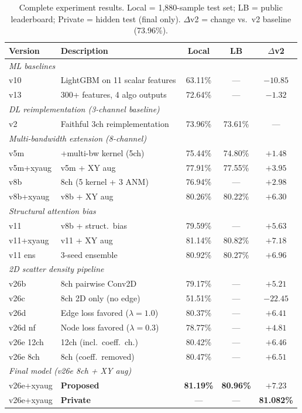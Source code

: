 \begin{table}[ht]
	\centering
	\caption{Complete experiment results. Local = 1,880-sample test set; LB = public leaderboard; Private = hidden test (final only). $\Delta$v2 = change vs.\ v2 baseline (73.96\%).}
	\label{tab:all_results}
	\small
	\begin{tabularx}{\textwidth}{lXccc}
		\toprule
		\textbf{Version} & \textbf{Description} & \textbf{Local} & \textbf{LB} & \textbf{$\Delta$v2} \\
		\midrule
		\multicolumn{5}{l}{\textit{ML baselines}} \\
		v10 & LightGBM on 11 scalar features & 63.11\% & --- & $-10.85$ \\
		v13 & 300+ features, 4 algo outputs & 72.64\% & --- & $-1.32$ \\
		\midrule
		\multicolumn{5}{l}{\textit{DL reimplementation (3-channel baseline)}} \\
		v2 & Faithful 3ch reimplementation & 73.96\% & 73.61\% & --- \\
		\midrule
		\multicolumn{5}{l}{\textit{Multi-bandwidth extension (8-channel)}} \\
		v5m & +multi-bw kernel (5ch) & 75.44\% & 74.80\% & $+1.48$ \\
		v5m+xyaug & v5m + XY aug & 77.91\% & 77.55\% & $+3.95$ \\
		v8b & 8ch (5 kernel + 3 ANM) & 76.94\% & --- & $+2.98$ \\
		v8b+xyaug & v8b + XY aug & 80.26\% & 80.22\% & $+6.30$ \\
		\midrule
		\multicolumn{5}{l}{\textit{Structural attention bias}} \\
		v11 & v8b + struct.\ bias & 79.59\% & --- & $+5.63$ \\
		v11+xyaug & v11 + XY aug & 81.14\% & 80.82\% & $+7.18$ \\
		v11 ens & 3-seed ensemble & 80.92\% & 80.27\% & $+6.96$ \\
		\midrule
		\multicolumn{5}{l}{\textit{2D scatter density pipeline}} \\
		v26b & 8ch pairwise Conv2D & 79.17\% & --- & $+5.21$ \\
		v26c & 8ch 2D only (no edge) & 51.51\% & --- & $-22.45$ \\
		v26d & Edge loss favored ($\lambda=1.0$) & 80.37\% & --- & $+6.41$ \\
		v26d nf & Node loss favored ($\lambda=0.3$) & 78.77\% & --- & $+4.81$ \\
		v26e 12ch & 12ch (incl.\ coeff.\ ch.) & 80.42\% & --- & $+6.46$ \\
		v26e 8ch & 8ch (coeff.\ removed) & 80.47\% & --- & $+6.51$ \\
		\midrule
		\multicolumn{5}{l}{\textit{Final model (v26e 8ch + XY aug)}} \\
		v26e+xyaug & \textbf{Proposed} & \textbf{81.19\%} & \textbf{80.96\%} & $\mathbf{+7.23}$ \\
		v26e+xyaug & \textbf{Private} & --- & --- & \textbf{81.082\%} \\
		\bottomrule
	\end{tabularx}
\end{table}

